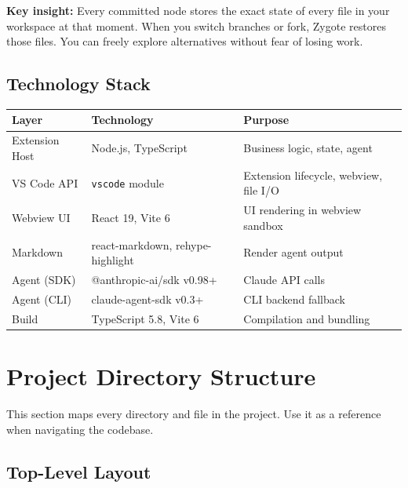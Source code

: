 \documentclass[12pt, a4paper]{article}
\begin{document}
\begin{keypoint}
\textbf{Key insight:} Every committed node stores the exact state of every file in your workspace at that moment. When you switch branches or fork, Zygote restores those files. You can freely explore alternatives without fear of losing work.
\end{keypoint}

\subsection{Technology Stack}

\begin{table}[H]
\centering
\begin{tabular}{@{}lll@{}}
\toprule
\textbf{Layer} & \textbf{Technology} & \textbf{Purpose} \\
\midrule
Extension Host & Node.js, TypeScript & Business logic, state, agent \\
VS Code API & \texttt{vscode} module & Extension lifecycle, webview, file I/O \\
Webview UI & React 19, Vite 6 & UI rendering in webview sandbox \\
Markdown & react-markdown, rehype-highlight & Render agent output \\
Agent (SDK) & @anthropic-ai/sdk v0.98+ & Claude API calls \\
Agent (CLI) & claude-agent-sdk v0.3+ & CLI backend fallback \\
Build & TypeScript 5.8, Vite 6 & Compilation and bundling \\
\bottomrule
\end{tabular}
\end{table}

\newpage

\section{Project Directory Structure}

This section maps every directory and file in the project. Use it as a reference when navigating the codebase.

\subsection{Top-Level Layout}
\end{document}
